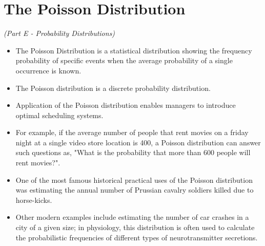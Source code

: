 \documentclass[]{article}
\begin{document}
\section*{The Poisson Distribution}
\textit{(Part E - Probability Distributions)}
\begin{itemize}
\item The Poisson Distribution is a statistical distribution showing the frequency probability of specific events when the average probability of a single occurrence is known. 

\item The Poisson distribution is a discrete probability distribution.

\item Application of the Poisson distribution enables managers to introduce optimal scheduling systems. 

\item For example, if the average number of people that rent movies on a friday night at a single video store location is 400,  a Poisson distribution can answer such questions as, "What is the probability that more than 600 people will rent movies?".



\item One of the most famous historical practical uses of the Poisson distribution was estimating the annual number of Prussian cavalry soldiers killed due to horse-kicks. 

\item Other modern examples include estimating the number of car crashes in a city of a given size; 
in physiology, this distribution is often used to calculate the probabilistic frequencies of different types of neurotransmitter secretions. 
\end{itemize}
\end{document}
